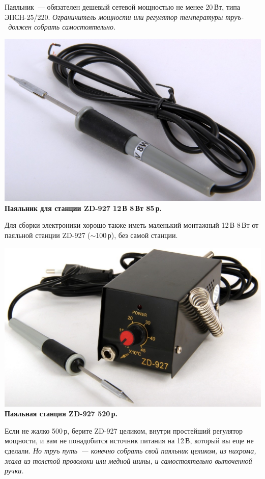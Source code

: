 \documentclass{magazine}
\begin{document}
{Паяльник\ --- обязателен дешевый сетевой мощностью не менее 20\,Вт, типа
ЭПСН-25/220.
\emph{Ограничитель мощности или регулятор температуры труъ-\scr\ должен собрать
самостоятельно.}

\noindent\href{http://voltmaster-samara.ru/catalog/product/00047380/}{
\includegraphics[width=\columnwidth]{fig/00/Iron8W.jpg}}
\textbf{Паяльник для станции ZD-927 12\,В 8\,Вт 85\,р.}

Для сборки электроники хорошо также иметь маленький монтажный 12\,В 8\,Вт от
паяльной станции ZD-927 ($\sim$100\,р), без самой станции. 

\noindent\href{http://voltmaster-samara.ru/catalog/product/00073790/}{
\includegraphics[width=\columnwidth]{fig/00/ZD927.jpg}}
\textbf{Паяльная станция ZD-927 520\,р.}

Если не жалко 500\,р, берите ZD-927 целиком, внутри простейший регулятор
мощности, и вам не понадобится источник питания на 12\,В, который вы еще не
сделали. \emph{Но труъ путь\ --- конечно собрать свой паяльник целиком, из
нихрома, жала из толстой проволоки или медной шины, и самостоятельно выточенной
ручки.}

}
\end{document}
